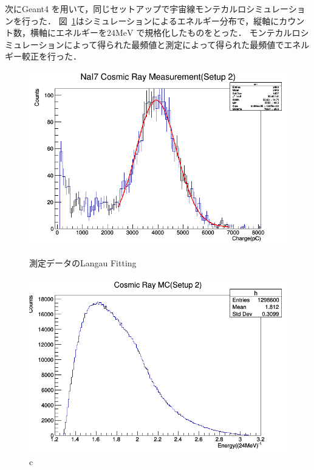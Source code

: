 次にGeant4 を用いて，同じセットアップで宇宙線モンテカルロシミュレーションを行った．
図~\ref{MC2}はシミュレーションによるエネルギー分布で，縦軸にカウント数，横軸にエネルギーを$24\mathrm{MeV}$ で規格化したものをとった．
モンテカルロシミュレーションによって得られた最頻値と測定によって得られた最頻値でエネルギー較正を行った．

\begin{figure}[H]
  \begin{minipage}{0.45\hsize}
    \begin{center}\hspace*{-1em}
  \includegraphics[width=1\textwidth]{figure/tajima/NaI7_Setup2.png}
      \caption{測定データのLangau Fitting}\label{langau}
    \end{center}
  \end{minipage}\hfill
  \begin{minipage}{0.45\hsize}
    \begin{center}
      \includegraphics[width=1\textwidth]{figure/tajima/MC2.png}
      \caption{c}\label{MC2}
    \end{center}
  \end{minipage}
\end{figure}

